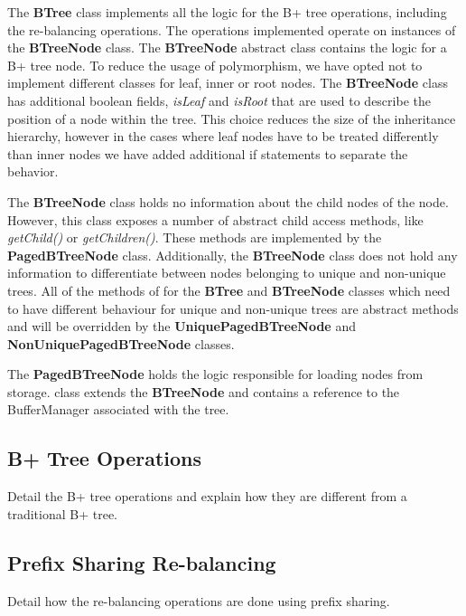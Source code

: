 \documentclass[11pt,a4paper,oneside]{article}
\begin{document}
The \textbf{BTree} class implements all the logic for the B+ tree operations, including the re-balancing operations. The operations implemented operate on instances of the \textbf{BTreeNode} class. The \textbf{BTreeNode} abstract class contains the logic for a B+ tree node. To reduce the usage of polymorphism, we have opted not to implement different classes for leaf, inner or root nodes. The \textbf{BTreeNode} class has additional boolean fields, \textit{isLeaf} and \textit{isRoot} that are used to describe the position of a node within the tree. This choice reduces the size of the inheritance hierarchy, however in the cases where leaf nodes have to be treated differently than inner nodes we have added additional if statements to separate the behavior. 

The \textbf{BTreeNode} class holds no information about the child nodes of the node. However, this class exposes a number of abstract child access methods, like \textit{getChild()} or \textit{getChildren()}. These methods are implemented by the \textbf{PagedBTreeNode} class. Additionally, the \textbf{BTreeNode} class does not hold any information to differentiate between nodes belonging to unique and non-unique trees. All of the methods of for the \textbf{BTree} and \textbf{BTreeNode} classes which need to have different behaviour for unique and non-unique trees are abstract methods and will be overridden by the \textbf{UniquePagedBTreeNode} and \textbf{NonUniquePagedBTreeNode} classes.

The \textbf{PagedBTreeNode} holds the logic responsible for loading nodes from storage. class extends the \textbf{BTreeNode} and contains a reference to the BufferManager associated with the tree. 


\subsection{B+ Tree Operations} %
\label{sub:b_tree_operations}
Detail the B+ tree operations and explain how they are different from a traditional B+ tree.


\subsection{Prefix Sharing Re-balancing} %
\label{sub:prefix_sharing_rebalancing}
Detail how the re-balancing operations are done using prefix sharing.

\end{document}
